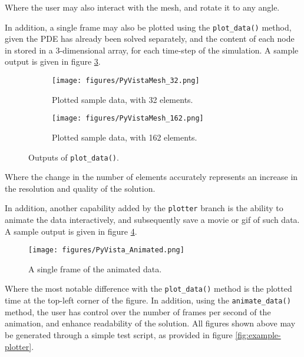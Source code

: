 Where the user may also interact with the mesh, and rotate it to any angle.

In addition, a single frame may also be plotted using the \texttt{plot\_data()} method, given the PDE has already been solved separately, and the content of each node in stored in a 3-dimensional array, for each time-step of the simulation. A sample output is given in figure \ref{fig:PyVistaPlotFrame}.

\begin{figure}[H]
    \centering
    \hfill
    \begin{subfigure}[c]{0.4\textwidth}
        \centering
        \texttt{[image: figures/PyVistaMesh\_32.png]}
        \caption{Plotted sample data, with 32 elements.}
        \label{fig:PyVistaMesh1}
    \end{subfigure}
    \hspace{0.1\textwidth}
    \begin{subfigure}[c]{0.4\textwidth}
        \centering
        \texttt{[image: figures/PyVistaMesh\_162.png]}
        \caption{Plotted sample data, with 162 elements.}
        \label{fig:PyVistaMesh2}
    \end{subfigure}
    \caption{Outputs of \texttt{plot\_data()}.}
    \label{fig:PyVistaPlotFrame}
    \hfill
\end{figure}

Where the change in the number of elements accurately represents an increase in the resolution and quality of the solution.

In addition, another capability added by the \texttt{plotter} branch is the ability to animate the data interactively, and subsequently save a movie or gif of such data. A sample output is given in figure \ref{fig:PyVistaAnimated}.

\begin{figure}[H]
    \centering
    \texttt{[image: figures/PyVista\_Animated.png]}
    \caption{A single frame of the animated data.}
    \label{fig:PyVistaAnimated}
\end{figure}

Where the most notable difference with the \texttt{plot\_data()} method is the plotted time at the top-left corner of the figure. In addition, using the \texttt{animate\_data()} method, the user has control over the number of frames per second of the animation, and enhance readability of the solution. All figures shown above may be generated through a simple test script, as provided in figure \ref{fig:example-plotter}.

